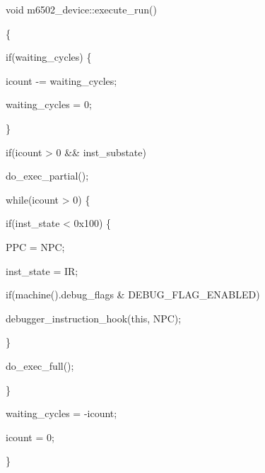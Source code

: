 \documentclass[letterpaper,10pt,brazil]{sphinxmanual}
\begin{document}
\begin{DUlineblock}{0em}
\item[] void m6502\_device::execute\_run()
\item[] \{
\item[]
\begin{DUlineblock}{\DUlineblockindent}
\item[] if(waiting\_cycles) \{
\item[]
\begin{DUlineblock}{\DUlineblockindent}
\item[] icount -= waiting\_cycles;
\item[] waiting\_cycles = 0;
\end{DUlineblock}
\item[] \}
\item[] 
\item[] if(icount \textgreater{} 0 \&\& inst\_substate)
\item[]
\begin{DUlineblock}{\DUlineblockindent}
\item[] do\_exec\_partial();
\item[] 
\end{DUlineblock}
\item[] while(icount \textgreater{} 0) \{
\item[]
\begin{DUlineblock}{\DUlineblockindent}
\item[] if(inst\_state \textless{} 0x100) \{
\item[]
\begin{DUlineblock}{\DUlineblockindent}
\item[] PPC = NPC;
\item[] inst\_state = IR;
\item[] if(machine().debug\_flags \& DEBUG\_FLAG\_ENABLED)
\item[]
\begin{DUlineblock}{\DUlineblockindent}
\item[] debugger\_instruction\_hook(this, NPC);
\end{DUlineblock}
\end{DUlineblock}
\item[] \}
\item[] do\_exec\_full();
\end{DUlineblock}
\item[] \}
\item[] 
\item[] waiting\_cycles = -icount;
\item[] icount = 0;
\end{DUlineblock}
\item[] \}
\end{DUlineblock}
\end{document}
